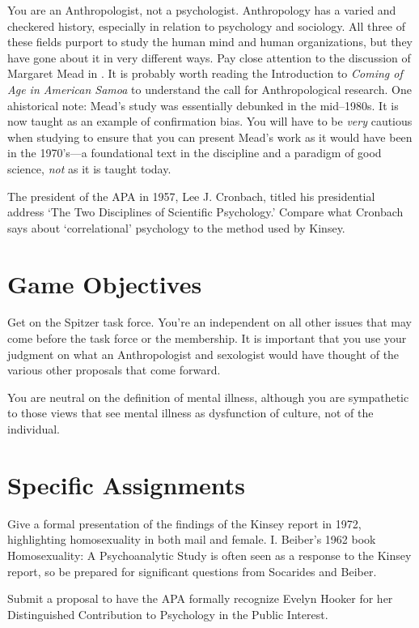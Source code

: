 \begin{refsection}
You are an Anthropologist, not a psychologist. Anthropology has a varied and checkered history, especially in relation to psychology and sociology. All three of these fields purport to study the human mind and human organizations, but they have gone about it in very different ways. Pay close attention to the discussion of Margaret Mead in . It is probably worth reading the Introduction to \emph{Coming of Age in American Samoa} to understand the call for Anthropological research. One ahistorical note: Mead's study was essentially debunked in the mid--1980s. It is now taught as an example of confirmation bias. You will have to be \emph{very} cautious when studying to ensure that you can present Mead's work as it would have been in the 1970's---a foundational text in the discipline and a paradigm of good science, \emph{not} as it is taught today. 

The president of the APA in 1957, Lee J. Cronbach, titled his presidential address `The Two Disciplines of Scientific Psychology.' Compare what Cronbach says about `correlational' psychology to the method used by Kinsey. 

\section{Game Objectives}
\label{gameobjectives}

Get on the Spitzer task force. You're an independent on all other issues that may come before the task force or the membership. It is important that you use your judgment on what an Anthropologist and sexologist would have thought of the various other proposals that come forward.

You are neutral on the definition of mental illness, although you are sympathetic to those views that see mental illness as dysfunction of culture, not of the individual. 

\section{Specific Assignments}
\label{specificassignments}

Give a formal presentation of the findings of the Kinsey report in 1972, highlighting homosexuality in both mail and female. I. Beiber's 1962 book Homosexuality: A Psychoanalytic Study is often seen as a response to the Kinsey report, so be prepared for significant questions from Socarides and Beiber.

Submit a proposal to have the APA formally recognize Evelyn Hooker for her Distinguished Contribution to Psychology in the Public Interest.


\end{refsection}
